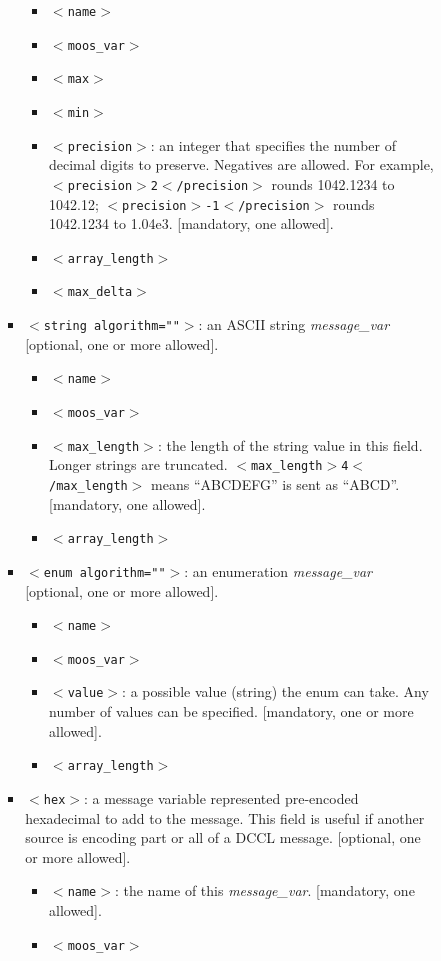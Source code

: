 \documentclass[11pt, letterpaper, oneside]{memoir}
\newcommand{\xmltag}[1]{\texttt{$<$#1$>$}}
\begin{document}
\begin{itemize}
\begin{itemize}
\begin{itemize}
\begin{itemize}
\begin{itemize}
\item \xmltag{name}
\item \xmltag{moos\_var}
\item \xmltag{max}
\item \xmltag{min}
\item \xmltag{precision}: an integer that specifies the number of decimal digits to preserve. Negatives are allowed. For example, \xmltag{precision$>$2$<$/precision} rounds 1042.1234 to 1042.12; \xmltag{precision$>$-1$<$/precision} rounds 1042.1234 to 1.04e3. [mandatory, one allowed].
\item \xmltag{array\_length}
\item \xmltag{max\_delta}
\end{itemize}
\item \xmltag{string algorithm=""}: an ASCII string \textit{message\_var} [optional, one or more allowed].
\begin{itemize}
\item \xmltag{name}
\item \xmltag{moos\_var}
\item \xmltag{max\_length}: the length of the string value in this field. Longer strings are truncated. \xmltag{max\_length$>$4$<$/max\_length} means ``ABCDEFG'' is sent as ``ABCD''. [mandatory, one allowed].
\item \xmltag{array\_length}
\end{itemize}
\item \xmltag{enum algorithm=""}: an enumeration \textit{message\_var} [optional, one or more allowed].
\begin{itemize}
\item \xmltag{name}
\item \xmltag{moos\_var}
\item \xmltag{value}: a possible value (string) the enum can take. Any number of values can be specified. [mandatory, one or more allowed].
\item \xmltag{array\_length}
\end{itemize}
\item \xmltag{hex}: a message variable represented pre-encoded hexadecimal to add to the message. This field is useful if another source is encoding part or all of a DCCL message. [optional, one or more allowed]. 
\begin{itemize}
\item \xmltag{name}: the name of this \textit{message\_var}. [mandatory, one allowed].
\item \xmltag{moos\_var}

\end{itemize}
\end{itemize}
\end{itemize}
\end{itemize}
\end{itemize}
\end{document}

